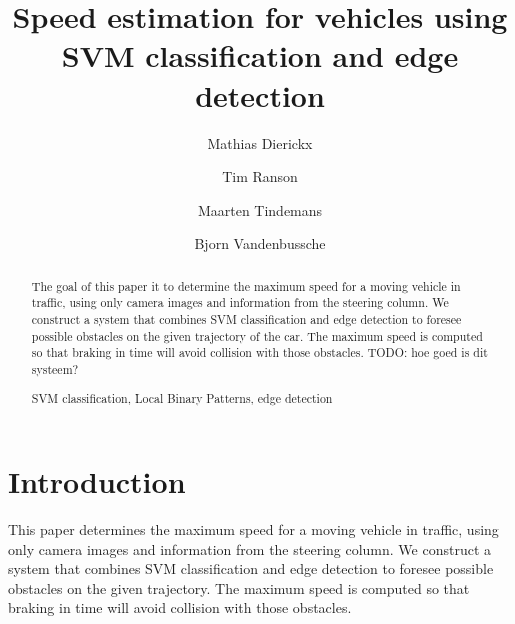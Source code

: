 \documentclass[runningheads,a4paper]{llncs}
\newcommand{\keywords}[1]{\par\addvspace\baselineskip
\newcommand\fnumber{\mathop{\mbox{$F$-$score$}}}
\noindent\keywordname\enspace\ignorespaces#1}
\begin{document}
\mainmatter  %

\title{Speed estimation for vehicles using \\SVM classification and edge detection}


%
%
\author{Mathias Dierickx\and Tim Ranson\and Maarten Tindemans\and Bjorn Vandenbussche}
%


\maketitle

\begin{abstract}
The goal of this paper it to determine the maximum speed for a moving vehicle in traffic, using only camera images and information from the steering column. We construct a system that combines SVM classification and edge detection to foresee possible obstacles on the given trajectory of the car. The maximum speed is computed so that braking in time will avoid collision with those obstacles. 
TODO: hoe goed is dit systeem?
\keywords{SVM classification, Local Binary Patterns, edge detection}
\end{abstract}


\section{Introduction}
This paper determines the maximum speed for a moving vehicle in traffic, using only camera images and information from the steering column. We construct a system that combines SVM classification and edge detection to foresee possible obstacles on the given trajectory. The maximum speed is computed so that braking in time will avoid collision with those obstacles.
\end{document}
